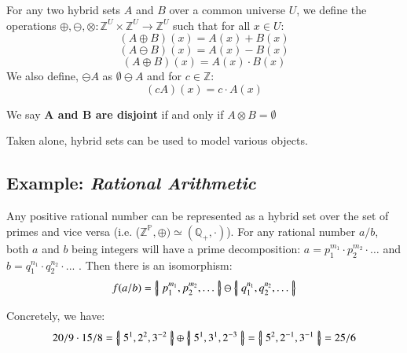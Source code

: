 \begin{definition}
	For any two hybrid sets $A$ and $B$ over a common universe $U$, 
	we define the operations $\oplus, \ominus, \otimes : \mathbb{Z}^U \times \mathbb{Z}^U \to \mathbb{Z}^U$ 
	such that for all $x \in U$:
	\begin{equation}
		(A \oplus B)(x) = A(x) + B(x)
	\end{equation}
	\begin{equation}
		(A \ominus B)(x) = A(x) - B(x)
	\end{equation}
	\begin{equation}
		(A \oplus B)(x) = A(x) \cdot B(x)
	\end{equation}
	We also define, $\ominus A$ as $\emptyset \ominus A$ and for $c \in \mathbb{Z}$:
	\begin{equation}
		(cA)(x) = c \cdot A(x)
	\end{equation}
\end{definition}


\begin{definition}
	We say \textbf{$\boldsymbol{A}$ and $\boldsymbol{B}$ are disjoint} if and only if $A \otimes B = \emptyset$
\end{definition}

Taken alone, hybrid sets can be used to model various objects. 


\subsection{Example: \emph{Rational Arithmetic}}


Any positive rational number can be represented as a hybrid set over the set of primes and vice versa  
(i.e. ($\mathbb{Z}^\mathbb{P}, \oplus) \simeq (\mathbb{Q}_+,\cdot)$).
For any rational number $a/b$, both $a$ and $b$ being integers will have a prime decomposition: 
$a=p_1^{m_1}\cdot p_2^{m_2} \cdot \ldots$ and $b=q_1^{n_1} \cdot q_2^{n_2} \cdot ...$ . 
Then there is an isomorphism:
\begin{equation}
	f(a/b) = \left\{ \! \left| \; p_1^{m_1}, p_2^{m_2}, \ldots \; \right| \! \right\} \ominus \left\{ \! \left| \; q_1^{n_1}, q_2^{n_2}, \ldots \; \right| \! \right\}
\end{equation}

\begin{example}
	Concretely, we have:
	\begin{equation*}
		20/9 \cdot 15/8 
			= \left\{ \! \left| \; 5^1, 2^2, 3^{-2} \; \right| \! \right\} \oplus \left\{ \! \left| \; 5^1, 3^1, 2^{-3} \; \right| \! \right\} 
			= \left\{ \! \left| \; 5^2, 2^{-1}, 3^{-1} \; \right| \! \right\} 
			= 25/6
	\end{equation*}
\end{example}

